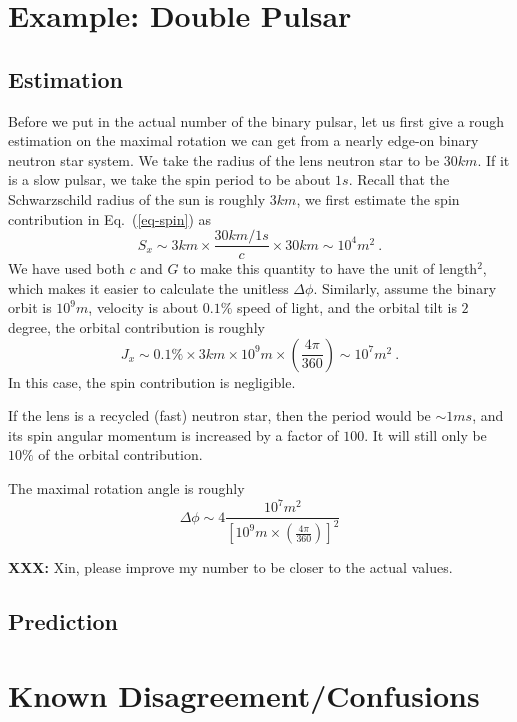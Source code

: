 \documentclass[aps,showpacs,onecolumn,floats,prd,superscriptaddress,nofootinbib]{revtex4}
\begin{document}
\section{Example: Double Pulsar}
\label{sec-prediction}

\subsection{Estimation}

Before we put in the actual number of the binary pulsar, let us first give a rough estimation on the maximal rotation we can get from a nearly edge-on binary neutron star system.
We take the radius of the lens neutron star to be $30km$.
If it is a slow pulsar, we take the spin period to be about $1s$.
Recall that the Schwarzschild radius of the sun is roughly $3km$, we first estimate the spin contribution in Eq.~(\ref{eq-spin}) as
\begin{equation}
S_x \sim 3km \times \frac{30km/1s}{c} \times 30km \sim 10^4 m^2~.
\end{equation}
We have used both $c$ and $G$ to make this quantity to have the unit of length$^2$, which makes it easier to calculate the unitless $\Delta\phi$.
Similarly, assume the binary orbit is $10^9 m$, velocity is about $0.1\%$ speed of light, and the orbital tilt is $2$ degree, the orbital contribution is roughly
\begin{equation}
J_x \sim 0.1\% \times 3km \times 10^9 m \times\left( \frac{4\pi}{360} \right) \sim 10^7 m^2~.
\end{equation}
In this case, the spin contribution is negligible.

If the lens is a recycled (fast) neutron star, then the period would be $\sim 1ms$, and its spin angular momentum is increased by a factor of $100$.
It will still only be $10\%$ of the orbital contribution.

The maximal rotation angle is roughly
\begin{equation}
\Delta\phi \sim 4 \frac{10^7 m^2}{\left[10^9m\times\left(\frac{4\pi}{360}\right)\right]^2}
\end{equation}

{\bf XXX:} Xin, please improve my number to be closer to the actual values.

\subsection{Prediction}

\section{Known Disagreement/Confusions}
\end{document}
